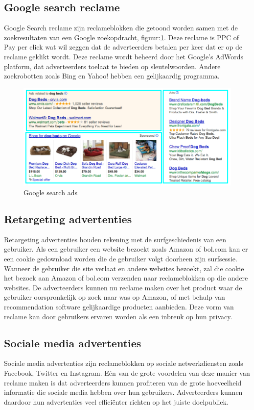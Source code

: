 \documentclass[pdftex,a4paper,12pt,twoside]{report}
\begin{document}
\subsection{Google search reclame }
\label{sec Google search reclame }
Google Search reclame zijn reclameblokken die getoond worden samen met de zoekresultaten van een Google zoekopdracht, figuur:\ref{fig: Google-Search-ad}. Deze reclame is PPC of Pay per click wat wil zeggen dat de adverteerders betalen per keer dat er op de reclame geklikt wordt. Deze reclame wordt beheerd door het Google’s AdWords platform, dat adverteerders toelaat te bieden op sleutelwoorden. Andere zoekrobotten zoals Bing en Yahoo! hebben een gelijkaardig programma.
\begin{figure}[h!]
\centering
\includegraphics[width=12cm]{img/example-of-google-ads}
\caption{Google search ads}
\label{fig: Google-Search-ad}
\end{figure}
\subsection{Retargeting advertenties }
\label{sec Retargeting advertenties }
Retargeting advertenties houden rekening met de surfgeschiedenis van een gebruiker. Als een gebruiker een website bezoekt zoals Amazon of bol.com kan er een cookie gedownload worden die de gebruiker volgt doorheen zijn surfsessie. Wanneer de gebruiker die site verlaat en andere websites bezoekt, zal die cookie het bezoek aan Amazon of bol.com verzenden naar reclameblokken op die andere websites. De adverteerders kunnen nu reclame maken over het product waar de gebruiker oorspronkelijk op zoek naar was op Amazon, of met behulp van recommendation software gelijkaardige producten aanbieden. Deze vorm van reclame kan door gebruikers ervaren worden als een inbreuk op hun privacy.
\subsection{Sociale media advertenties }
\label{sec Sociale media advertenties }
Sociale media advertenties zijn reclameblokken op sociale netwerkdiensten zoals Facebook, Twitter en Instagram. Eén van de grote voordelen van deze manier van reclame maken is dat adverteerders kunnen profiteren van de grote hoeveelheid informatie die sociale media hebben over hun gebruikers. Adverteerders kunnen daardoor hun advertenties veel efficiënter richten op het juiste doelpubliek.
\end{document}
